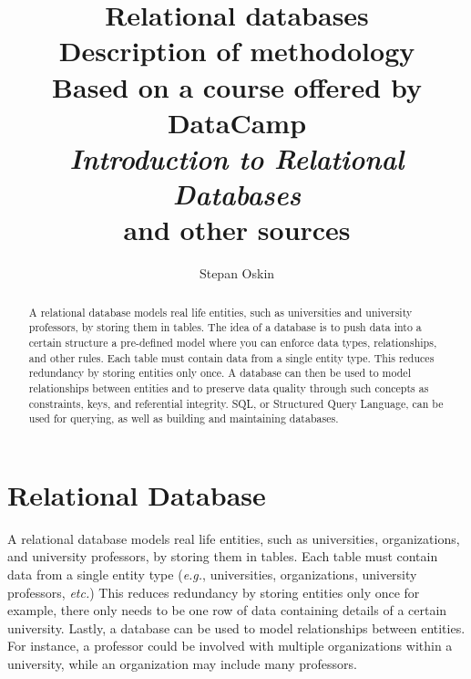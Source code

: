 \documentclass[11pt]{article}
\begin{document}
    \title{Relational databases \\
    Description of methodology \\
    Based on a course offered by DataCamp \\
    \textit{Introduction to Relational Databases}\cite{Grossenbacher2019} \\
    and other sources}

    \author{Stepan Oskin}

    \maketitle

    \begin{abstract}
        A relational database models real life entities, such as universities and university professors, by storing them in tables.
        The idea of a database is to push data into a certain structure \textemdash a pre-defined model \textemdash where you can enforce data types, relationships, and other rules.
        Each table must contain data from a single entity type.
        This reduces redundancy by storing entities only once.
        A database can then be used to model relationships between entities and to preserve data quality through such concepts as constraints, keys, and referential integrity.
        SQL, or Structured Query Language, can be used for querying, as well as building and maintaining databases.
    \end{abstract}

    \section{Relational Database} \label{sec:rdb}

    A relational database models real life entities, such as universities, organizations, and university professors, by storing them in tables.
    Each table must contain data from a single entity type (\textit{e.g.}, universities, organizations, university professors, \textit{etc.})
    This reduces redundancy by storing entities only once \textemdash for example, there only needs to be one row of data containing details of a certain university.
    Lastly, a database can be used to model relationships between entities.
    For instance, a professor could be involved with multiple organizations within a university, while an organization may include many professors.
\end{document}
